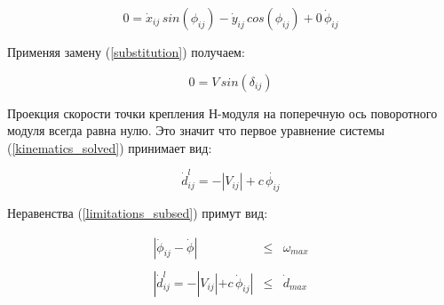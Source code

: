 \begin{equation}
0 = \dot{x}_{ij}\,sin(\phi_{ij})-\dot{y}_{ij}\,cos(\phi_{ij}) + 0\,\dot{\phi}_{ij}
\end{equation}
	
	Применяя замену (\ref{substitution}) получаем:
	
	\begin{equation}
		0 = V\,sin(\delta_{ij})
	\end{equation}
	
	Проекция скорости точки крепления Н-модуля на поперечную ось поворотного модуля всегда равна нулю. Это значит что первое уравнение системы (\ref{kinematics_solved}) принимает вид:
	
	\begin{equation}
		\dot{d}^l_{ij} = -|V_{ij}|+c\,\dot{\phi_{ij}}
	\end{equation}
	
Неравенства (\ref{limitations_subsed}) примут вид:

\begin{equation}
\begin{array}{rcl}
|\dot{\phi}_{ij}-\dot{\phi}|&\leq&\omega_{max}\\
\\
|\dot{d}^l_{ij} = -|V_{ij}|+c\,\dot{\phi}_{ij}|&\leq&\dot{d}_{max}\\
\end{array}
\end{equation}

